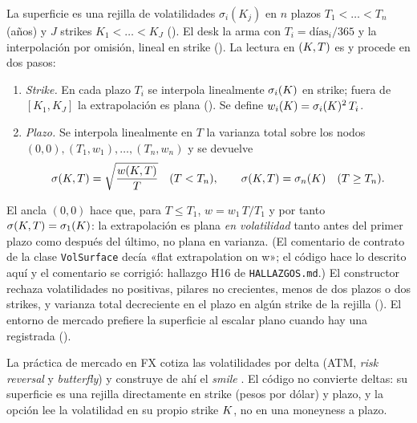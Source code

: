 La superficie es una rejilla de volatilidades $\sigma_i(K_j)$ en $n$ plazos $T_1<\dots<T_n$ (años) y $J$
strikes $K_1<\dots<K_J$ (). El desk la arma
con $T_i=\text{días}_i/365$ y la interpolación por omisión, lineal en strike
(). La lectura en $(K,T)$ es
 y procede en dos pasos:
\begin{enumerate}
  \item \emph{Strike.} En cada plazo $T_i$ se interpola linealmente $\sigma_i(K)$ en strike; fuera de
        $[K_1,K_J]$ la extrapolación es plana ().
        Se define $w_i(K)=\sigma_i(K)^2\,T_i$.
  \item \emph{Plazo.} Se interpola linealmente en $T$ la varianza total sobre los nodos
        $(0,0),\allowbreak(T_1,w_1),\allowbreak\dots,\allowbreak(T_n,w_n)$ y se devuelve
        \begin{equation}\label{eq:cap04-vol}
          \sigma(K,T)=\sqrt{\frac{w(K,T)}{T}}\quad (T<T_n),\qquad \sigma(K,T)=\sigma_n(K)\quad (T\ge T_n).
        \end{equation}
\end{enumerate}
El ancla $(0,0)$ hace que, para $T\le T_1$, $w=w_1\,T/T_1$ y por tanto $\sigma(K,T)=\sigma_1(K)$: la
extrapolación es plana \emph{en volatilidad} tanto antes del primer plazo como después del último, no plana
en varianza. (El comentario de contrato de la clase \texttt{VolSurface} decía «flat extrapolation on w»; el
código hace lo descrito aquí y el comentario se corrigió: hallazgo H16 de \texttt{HALLAZGOS.md}.) El constructor rechaza volatilidades no positivas, pilares no crecientes, menos de dos plazos o
dos strikes, y varianza total decreciente en el plazo en algún strike de la rejilla
(). El entorno de mercado prefiere la superficie
al escalar plano cuando hay una registrada
().

\begin{diferencia}
  La práctica de mercado en FX cotiza las volatilidades por delta (ATM, \emph{risk reversal} y
  \emph{butterfly}) y construye de ahí el \emph{smile} \citep{wystup2017}. El código no convierte deltas: su
  superficie es una rejilla directamente en strike (pesos por dólar) y plazo, y la opción lee la
  volatilidad en su propio strike $K$, no en una moneyness a plazo.
\end{diferencia}

